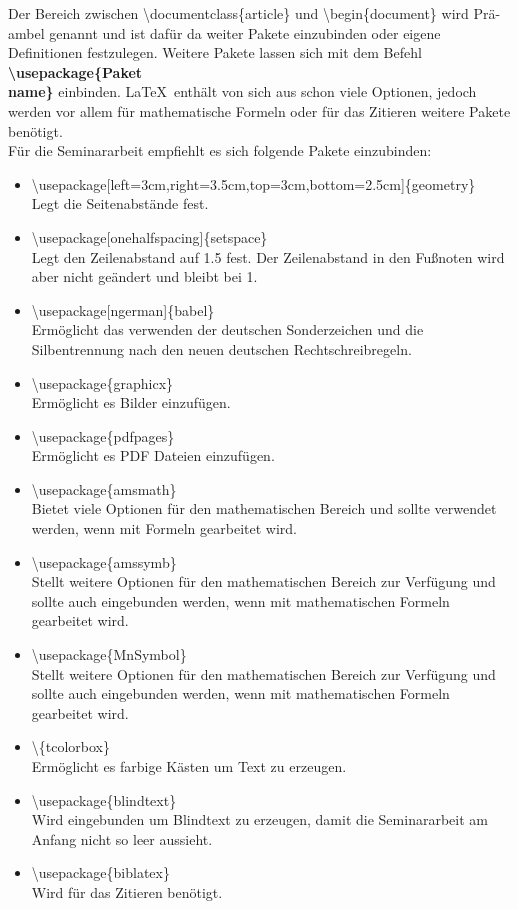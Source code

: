 \documentclass[a4paper, 12pt]{scrreprt}
\begin{document}
\noindent Der Bereich zwischen \textbackslash documentclass\{article\} und \textbackslash begin\{document\} wird Prä-\\ambel genannt und ist dafür da weiter Pakete einzubinden oder eigene Definitionen festzulegen. Weitere Pakete lassen sich mit dem Befehl \textbf{\textbackslash usepackage\{Paket\\name\}} einbinden. \LaTeX\, enthält von sich aus schon viele Optionen, jedoch werden vor allem für mathematische Formeln oder für das Zitieren weitere Pakete benötigt.\\
Für die Seminararbeit empfiehlt es sich folgende Pakete einzubinden:\\
\begin{itemize}
\item \textbackslash usepackage[left=3cm,right=3.5cm,top=3cm,bottom=2.5cm]\{geometry\}\\
Legt die Seitenabstände fest.
\item \textbackslash usepackage[onehalfspacing]\{setspace\}\\
Legt den Zeilenabstand auf 1.5 fest. Der Zeilenabstand in den Fußnoten wird aber nicht geändert und bleibt bei 1.
\item \textbackslash usepackage[ngerman]\{babel\}\\
Ermöglicht das verwenden der deutschen Sonderzeichen und die Silbentrennung nach den neuen deutschen Rechtschreibregeln.
\item \textbackslash usepackage\{graphicx\}\\
Ermöglicht es Bilder einzufügen.
\item \textbackslash usepackage\{pdfpages\}\\
Ermöglicht es PDF Dateien einzufügen.
\item \textbackslash usepackage\{amsmath\}\\
Bietet viele Optionen für den mathematischen Bereich und sollte verwendet werden, wenn mit Formeln gearbeitet wird.
\item \textbackslash usepackage\{amssymb\}\\
Stellt weitere Optionen für den mathematischen Bereich zur Verfügung und sollte auch eingebunden werden, wenn mit mathematischen Formeln gearbeitet wird.
\item \textbackslash usepackage\{MnSymbol\}\\
Stellt weitere Optionen für den mathematischen Bereich zur Verfügung und sollte auch eingebunden werden, wenn mit mathematischen Formeln gearbeitet wird.
\item \textbackslash \{tcolorbox\}\\
Ermöglicht es farbige Kästen um Text zu erzeugen.
\item \textbackslash usepackage\{blindtext\}\\
Wird eingebunden um Blindtext zu erzeugen, damit die Seminararbeit am Anfang nicht so leer aussieht. 
\item \textbackslash usepackage\{biblatex\}\\
Wird für das Zitieren benötigt.
\end{itemize}
\end{document}
